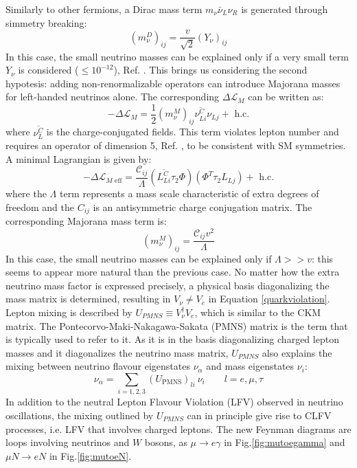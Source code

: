 Similarly to other fermions, a Dirac mass term $m_{\nu} \bar{\nu}_L \nu_R$ is generated through simmetry breaking:
\begin{equation}
\left(m_\nu^D\right)_{i j}=\frac{v}{\sqrt{2}}\left(Y_\nu\right)_{i j}
\end{equation}
In this case, the small neutrino masses can be explained only if a very small term $Y_\nu$ is considered ($\leq 10^{-12}$), Ref. \cite{clfv_signorelli}. This brings us considering the second hypotesis: adding non-renormalizable operators can introduce Majorana masses for left-handed neutrinos alone. The corresponding $\Delta \mathscr{L}_M$ can be written as:
\begin{equation}
-\Delta \mathscr{L}_M=\frac{1}{2}\left(m_\nu^M\right)_{i j} \overline{\nu_{L i}^C} \nu_{L j}+\text{ h.c.}
\end{equation}
where $\overline{\nu_{L }^C} $ is the charge-conjugated fields. This term violates lepton number and requires an operator of dimension 5, Ref. \cite{wein}, to be consistent with SM symmetries. A minimal Lagrangian is given by:
\begin{equation}
-\Delta \mathscr{L}_{M \text { eff}}=\frac{\mathcal{C}_{i j}}{\Lambda}\left(\overline{L_{L i}^C} \tau_2 \Phi\right)\left(\Phi^T \tau_2 L_{L j}\right)+\text { h.c.}
\end{equation}
where the $\Lambda$ term represents a mass scale characteristic of extra degrees of freedom and the $C_{ij}$ is an antisymmetric charge conjugation matrix. The corresponding Majorana mass term is:
\begin{equation}
\left(m_\nu^M\right)_{i j}=\frac{\mathcal{C}_{i j} v^2}{\Lambda}
\end{equation}
In this case, the small neutrino masses can be explained only if $\Lambda > > v$: this seems to appear more natural than the previous case. No matter how the extra neutrino mass factor is expressed precisely, a physical basis diagonalizing the mass matrix is determined, resulting in $V_{\nu} \neq V_e$ in Equation \ref{quarkviolation}. Lepton mixing is described by $U_{PMNS} \equiv V_{\nu}^{\dagger} V_e$, which is similar to the CKM matrix. The Pontecorvo-Maki-Nakagawa-Sakata (PMNS) matrix is the term that is typically used to refer to it. As it is in the basis diagonalizing charged lepton masses and it diagonalizes the neutrino mass matrix, $U_{PMNS}$ also explains the mixing between neutrino flavour eigenstates $\nu_{\alpha}$ and mass eigenstates $\nu_i$:
\begin{equation}
\nu_\alpha=\sum_{i=1,2,3}\left(U_{\mathrm{PMNS}}\right)_{l i} \ \nu_i \qquad l=e, \mu, \tau
\end{equation}
In addition to the neutral Lepton Flavour Violation (LFV) observed in neutrino oscillations, the mixing outlined by $U_{PMNS}$ can in principle give rise to CLFV processes, i.e. LFV that involves charged leptons. The new Feynman diagrams are loops involving neutrinos and $W$ bosons, as $\mu \rightarrow e \gamma$ in Fig.\ref{fig:mutoegamma} and $\mu N \rightarrow e N$ in Fig.\ref{fig:mutoeN}. 



